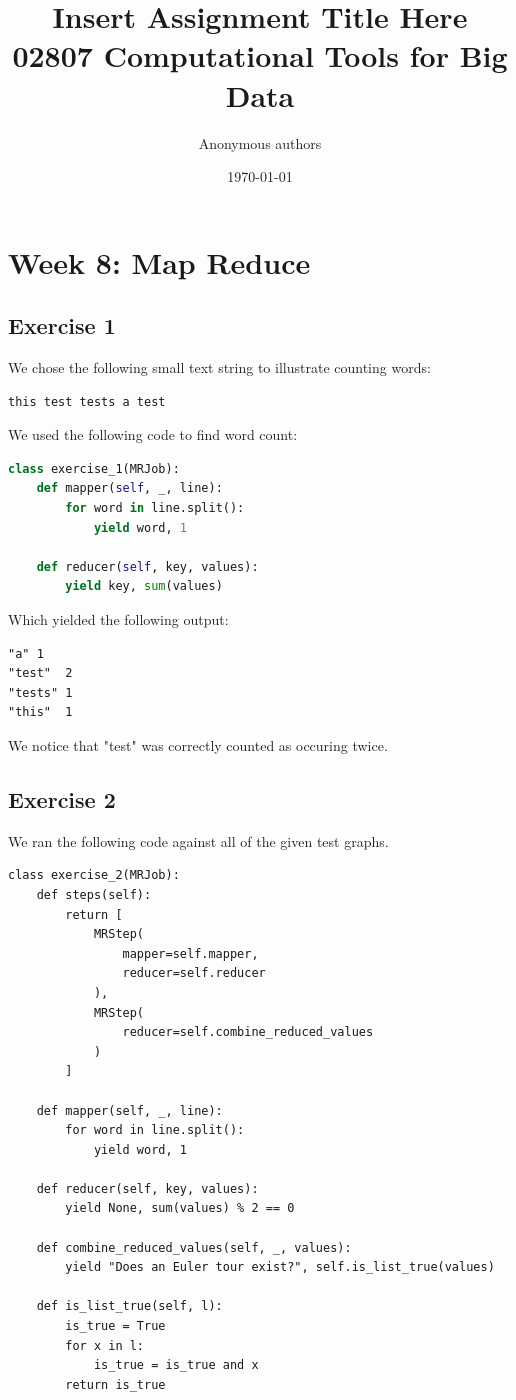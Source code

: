 \documentclass{article}
\title{Insert Assignment Title Here\\02807 Computational Tools for Big Data}
\author{Anonymous authors}
\date{
	\today
}
\begin{document}
\maketitle

\section{Week 8: Map Reduce}

\subsection{Exercise 1}
\label{sub:Exercise 1}

We chose the following small text string to illustrate counting words:

\begin{lstlisting}
this test tests a test
\end{lstlisting}

We used the following code to find word count:

\begin{lstlisting}[language=Python]
class exercise_1(MRJob):
    def mapper(self, _, line):
        for word in line.split():
            yield word, 1

    def reducer(self, key, values):
        yield key, sum(values)
\end{lstlisting}

Which yielded the following output:

\begin{lstlisting}
"a"	1
"test"	2
"tests"	1
"this"	1
\end{lstlisting}

We notice that "test" was correctly counted as occuring twice.

\subsection{Exercise 2}
\label{sub:Exercise 2}

We ran the following code against all of the given test graphs.

\begin{lstlisting}
class exercise_2(MRJob):
    def steps(self):
        return [
            MRStep(
                mapper=self.mapper,
                reducer=self.reducer
            ),
            MRStep(
                reducer=self.combine_reduced_values
            )
        ]

    def mapper(self, _, line):
        for word in line.split():
            yield word, 1

    def reducer(self, key, values):
        yield None, sum(values) % 2 == 0

    def combine_reduced_values(self, _, values):
        yield "Does an Euler tour exist?", self.is_list_true(values)

    def is_list_true(self, l):
        is_true = True
        for x in l:
            is_true = is_true and x
        return is_true
\end{lstlisting}
\end{document}
